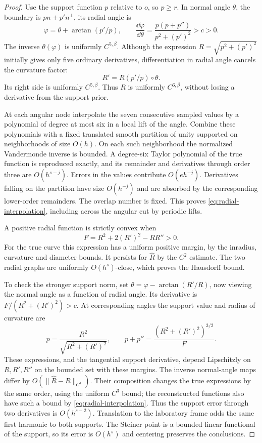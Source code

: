 \begin{proof}
Use the support function $p$ relative to $o$, so $p\ge r$. In normal
angle $\theta$, the boundary is $p n+p' n^\perp$, its radial angle is
\[
 \varphi=\theta+\arctan(p'/p),\qquad
 \frac{\dd\varphi}{\dd\theta}
             =\frac{p(p+p'')}{p^2+(p')^2}>c>0.
\]
The inverse $\theta(\varphi)$ is uniformly $C^{5,\beta}$. Although
the expression $R=\sqrt{p^2+(p')^2}$ initially gives only five
ordinary derivatives, differentiation in radial angle cancels the
curvature factor:
\begin{equation}\label{eq:radial-cancellation}
                   R'=R(p'/p)\circ\theta.
\end{equation}
Its right side is uniformly $C^{5,\beta}$. Thus $R$ is uniformly
$C^{6,\beta}$, without losing a derivative from the support prior.

At each angular node interpolate the seven consecutive sampled
values by a polynomial of degree at most six in a local lift of the
angle. Combine these polynomials with a fixed translated smooth
partition of unity supported on neighborhoods of size $O(h)$.
On each such neighborhood the normalized Vandermonde inverse is
bounded. A degree-six Taylor polynomial of the true function is
reproduced exactly, and its remainder and derivatives through order
three are $O(h^{s-j})$. Errors in the values contribute $O(eh^{-j})$.
Derivatives falling on the partition have size $O(h^{-j})$ and are
absorbed by the corresponding lower-order remainders. The overlap
number is fixed. This proves \eqref{eq:radial-interpolation}, including
across the angular cut by periodic lifts.

A positive radial function is strictly convex when
\[
       F=R^2+2(R')^2-RR''>0.
\]
For the true curve this expression has a uniform positive margin,
by the inradius, curvature and diameter bounds. It persists for
$\widehat R$ by the $C^2$ estimate. The two radial graphs are uniformly
$O(h^s)$-close, which proves the Hausdorff bound.

To check the stronger support norm, set
$\theta=\varphi-\arctan(R'/R)$, now viewing the normal angle as a
function of radial angle. Its derivative is
$F/(R^2+(R')^2)>c$. At corresponding angles the support value and
radius of curvature are
\[
 p=\frac{R^2}{\sqrt{R^2+(R')^2}},\qquad
 p+p''=\frac{(R^2+(R')^2)^{3/2}}{F}.
\]
These expressions, and the tangential support derivative, depend
Lipschitzly on $R,R',R''$ on the bounded set with these margins.
The inverse normal-angle maps differ by $O(\|\widehat R-R\|_{C^1})$.
Their composition changes the true expressions by the same order,
using the uniform $C^3$ bound; the reconstructed functions also have
such a bound by \eqref{eq:radial-interpolation}. Thus the support
error through two derivatives is $O(h^{s-2})$. Translation to the
laboratory frame adds the same first harmonic to both supports. The
Steiner point is a bounded linear functional of the support, so its
error is $O(h^s)$ and centering preserves the conclusions.
\end{proof}

